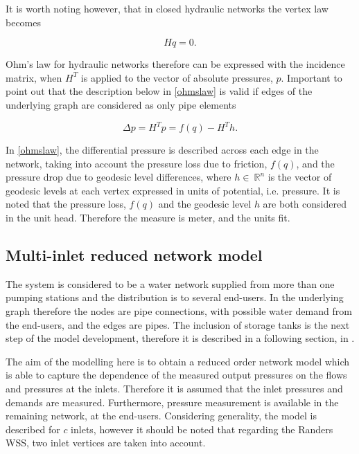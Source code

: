 It is worth noting however, that in closed hydraulic networks the vertex law becomes

\begin{equation}
  \label{vertexlaw_closed}
  Hq = 0.
\end{equation}

Ohm's law for hydraulic networks therefore can be expressed with the incidence matrix, when $H^T$ is applied to the vector of absolute pressures, $p$. Important to point out that the description below in \eqref{ohmslaw} is valid if edges of the underlying graph are considered as only pipe elements

\begin{equation}
  \label{ohmslaw}
  \Delta p = H^Tp = f(q) - H^Th.
\end{equation}

In \eqref{ohmslaw}, the differential pressure is described across each edge in the network, taking into account the pressure loss due to friction, $f(q)$, and the pressure drop due to geodesic level differences,  where $h \in \: \mathbb{R}^{n}$ is the vector of geodesic levels at each vertex expressed in units of potential, i.e. pressure. It is noted that the pressure loss, $f(q)$ and the geodesic level $h$ are both considered in the unit head. Therefore the measure is meter, and the units fit. 


\subsection{Multi-inlet reduced network model}
\label{multi_inlet_reduced_network_description}

The system is considered to be a water network supplied from more than one pumping stations and the distribution is to several end-users. In the underlying graph therefore the nodes are pipe connections, with possible water demand from the end-users, and the edges are pipes. The inclusion of storage tanks is the next step of the model development, therefore it is described in a following section, in .

The aim of the modelling here is to obtain a reduced order network model which is able to capture the dependence of the measured output pressures on the flows and pressures at the inlets. Therefore it is assumed that the inlet pressures and demands are measured. Furthermore, pressure measurement is available in the remaining network, at the end-users. Considering generality, the model is described for $c$ inlets, however it should be noted that regarding the Randers WSS, two inlet vertices are taken into account. 


